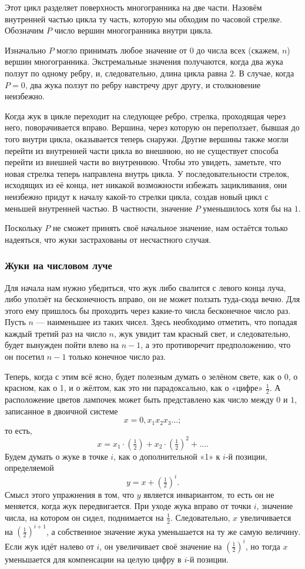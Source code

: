 Этот цикл разделяет поверхность многогранника на две части.
Назовём внутренней частью цикла ту часть, которую мы обходим по часовой стрелке.
Обозначим $P$ число вершин многогранника внутри цикла.

Изначально $P$ могло принимать любое значение от $0$ до числа всех (скажем, $n$) вершин многогранника.
Экстремальные значения получаются, когда два жука ползут по одному ребру, и, следовательно, длина цикла равна $2$.
В случае, когда $P=0$, два жука ползут по ребру навстречу друг другу, и столкновение неизбежно.

Когда жук в цикле переходит на следующее ребро, стрелка, проходящая через него, поворачивается вправо.
Вершина, через которую он переползает, бывшая до того внутри цикла, оказывается теперь снаружи.
Другие вершины также могли перейти из внутренней части цикла во внешнюю, но не существует способа перейти из внешней части во внутреннюю.
Чтобы это увидеть, заметьте, что новая стрелка теперь направлена внутрь цикла.
У последовательности стрелок, исходящих из её конца, нет никакой возможности избежать зацикливания, они неизбежно придут к началу какой-то стрелки цикла, создав новый цикл с меньшей внутренней частью.
В частности, значение $P$ уменьшилось хотя бы на $1$.

Поскольку $P$ не сможет принять своё начальное значение, нам остаётся только надеяться, что жуки застрахованы от несчастного случая.
\heart

\subsubsection*{Жуки на числовом луче}%

Для начала нам нужно убедиться, что жук либо свалится с левого конца луча, либо уползёт на бесконечность вправо, он не может ползать туда-сюда вечно.
Для этого ему пришлось бы проходить через какие-то числа бесконечное число раз.
Пусть $n$ --- наименьшее из таких чисел.
Здесь необходимо отметить, что попадая каждый третий раз на число $n$, жук увидит там красный свет, и следовательно, будет вынужден пойти влево на $n-1$, а это противоречит предположению, что он посетил $n-1$ только конечное число раз.

Теперь, когда с этим всё ясно, будет полезным думать о зелёном свете, как о 0, о красном, как о 1, и о жёлтом, как это ни парадоксально, как о «цифре» $\tfrac12$.
А расположение цветов лампочек может быть представлено как число между $0$ и $1$, записанное в двоичной системе
\[x = 0{,}x_1x_2x_3\dots;\]
то есть,
 \[x = x_1\cdot(\tfrac12)+x_2\cdot(\tfrac12)^2+\dots.\]
Будем думать о жуке в точке $i$, как о дополнительной «1» к $i$-й позиции, определяемой 
\[y=x+(\tfrac12)^i.\]
Смысл этого упражнения в том, что $y$ является инвариантом, то есть он не меняется, когда жук передвигается.
При уходе жука вправо от точки $i$, значение числа, на котором он сидел, поднимается на $\tfrac12$.
Следовательно, $x$ увеличивается на $(\tfrac12)^{i+1}$, а собственное значение жука уменьшается на ту же самую величину.
Если жук идёт налево от $i$, он увеличивает своё значение на $(\tfrac12)^i$, но тогда $x$ уменьшается для компенсации на целую цифру в $i$-й позиции.

